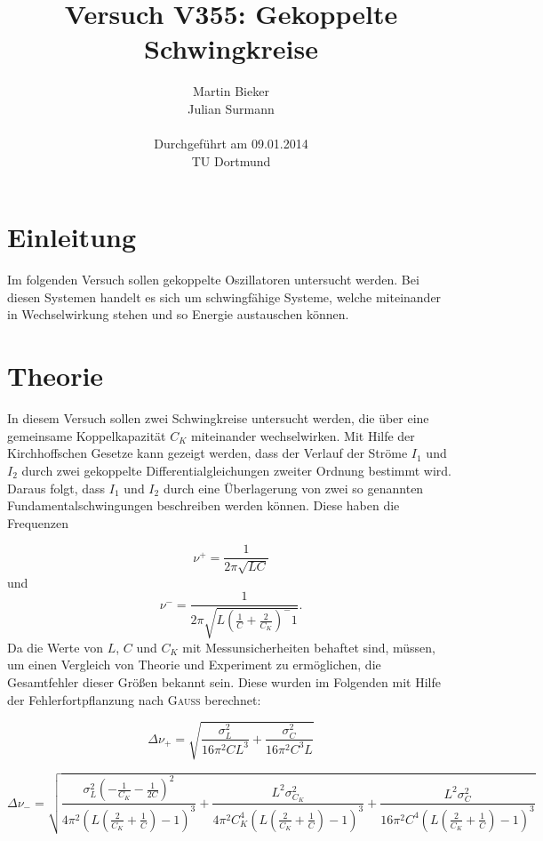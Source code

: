 \documentclass[11pt,ngerman,a4paper]{article}
\title{\textbf{Versuch V355: Gekoppelte Schwingkreise}}
\author{Martin Bieker\\
		Julian Surmann\\
		\\
		Durchgef\"{u}hrt am 09.01.2014\\
		TU Dortmund}
\date{}
\begin{document}
\renewcommand\tablename{Tabelle}
\renewcommand\figurename{Abbildung}
\maketitle
\thispagestyle{empty}
\newpage
\clearpage
\setcounter{page}{1}


\section{Einleitung}
Im folgenden Versuch sollen gekoppelte Oszillatoren untersucht werden. Bei diesen Systemen handelt es sich um schwingfähige Systeme, welche miteinander in Wechselwirkung stehen und so Energie austauschen können. 

\section{Theorie}

In diesem Versuch sollen zwei Schwingkreise untersucht werden, die über eine gemeinsame Koppelkapazität $C_K$ miteinander wechselwirken. Mit Hilfe der Kirchhoffschen Gesetze kann gezeigt werden, dass der Verlauf der Ströme $I_1$ und $I_2$ durch zwei gekoppelte Differentialgleichungen zweiter Ordnung bestimmt wird. Daraus folgt, dass $I_1$ und $I_2$ durch eine Überlagerung von zwei so genannten Fundamentalschwingungen beschreiben werden können. Diese haben die Frequenzen

\begin{equation}
\nu^+ = \frac{1}{2 \pi \sqrt{LC}}
\label{nueplus}
\end{equation}
und 
\begin{equation}
\nu^- =\frac1{2\pi\sqrt{L(\frac1C + \frac2{C_K})^-1}}.
\label{nueminus}
\end{equation}
Da die Werte von $L$, $C$ und $C_K$ mit Messunsicherheiten behaftet sind, müssen, um einen Vergleich von Theorie und Experiment zu ermöglichen, die Gesamtfehler dieser Größen bekannt sein. Diese wurden im Folgenden mit Hilfe der Fehlerfortpflanzung nach \textsc{Gauss} berechnet:

\begin{equation}
\Delta \nu_+ = \sqrt{\frac{\sigma_{L}^{2}}{16 \pi^{2} C L^{3}} + \frac{\sigma_{C}^{2}}{16 \pi^{2} C^{3} L}}
\end{equation}

\begin{equation}
\Delta \nu_- = \sqrt{\frac{\sigma_{L}^{2} \left(- \frac{1}{C_{K}} - \frac{1}{2 C}\right)^{2}}{4 \pi^{2} \left(L \left(\frac{2}{C_{K}} + \frac{1}{C}\right) - 1\right)^{3}} + \frac{L^{2} \sigma_{C_{K}}^{2}}{4 \pi^{2} C_{K}^{4} \left(L \left(\frac{2}{C_{K}} + \frac{1}{C}\right) - 1\right)^{3}} + \frac{L^{2} \sigma_{C}^{2}}{16 \pi^{2} C^{4} \left(L \left(\frac{2}{C_{K}} + \frac{1}{C}\right) - 1\right)^{3}}}
\end{equation}
\end{document}

